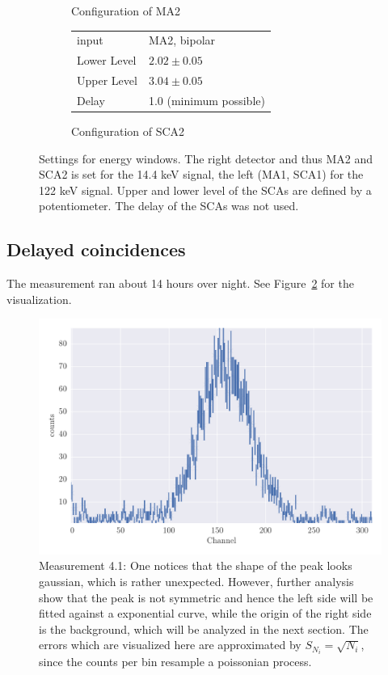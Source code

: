 \begin{figure}[h]
\begin{subfigure}[b]{0.4\linewidth}
\begin{tabular}{|l|l|}
            \hline
        \end{tabular}
        \caption{Configuration of MA2}
    \end{subfigure} \qquad
    \begin{subfigure}[b]{0.4\linewidth}
        \begin{tabular}{|l|l|}
            \hline
            input           & MA2, bipolar \\ 
            Lower Level     & $2.02\pm0.05$ \\
            Upper Level     & $3.04\pm0.05$ \\
            Delay           & 1.0 (minimum possible) \\
            \hline
        \end{tabular}
        \caption{Configuration of SCA2}
    \end{subfigure}
    \caption{
        Settings for energy windows. The right detector and thus MA2 and SCA2 is set for the 14.4 keV signal, 
        the left (MA1, SCA1) for the 122 keV signal. Upper and lower level of the SCAs are defined by 
        a potentiometer. The delay of the SCAs was not used. 
        }
    \label{fig:stereo}
\end{figure}

\clearpage
\subsection{Delayed coincidences}
The measurement ran about 14 hours over night. See Figure~\ref{fig:4_1} for the visualization.
\label{ssub:Conduction of the experiment over night}

\begin{figure}[htpb]
    \centering
    \includegraphics[width=1.0\linewidth]{analysis/figures/plot4_1}
    \caption{Measurement 4.1: One notices that the shape
        of the peak looks gaussian, which is rather unexpected. However,
        further analysis show that the peak is not symmetric and hence the left 
        side will be fitted against a exponential curve, while the origin of the
        right side is the background, which will be analyzed in the next section.
        The errors which are visualized here are approximated by $S_{N_i} = \sqrt{N_i}$, since
        the counts per bin resample a poissonian process.}
    \label{fig:4_1}
\end{figure}
\clearpage
